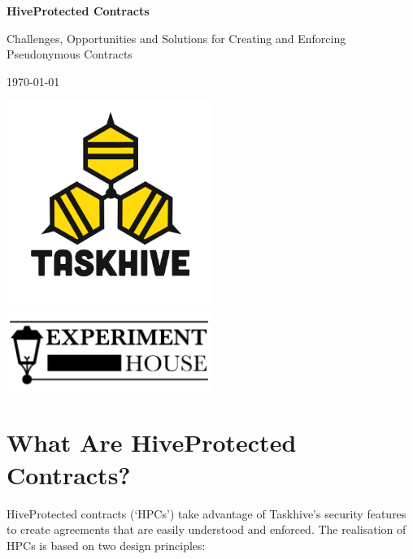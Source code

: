 \documentclass[a4paper,12pt]{article}
\begin{document}
\vspace*{\fill}

\begin{titlebox}
\begin{center}
\Huge{\textbf{HiveProtected Contracts}}

\vspace{1em}

\large{Challenges, Opportunities and Solutions for Creating and Enforcing Pseudonymous Contracts}

\vspace{1em}

\large{\today}
\end{center}
\end{titlebox}

\vfill

\begin{center}
\includegraphics[width=0.5\textwidth]{TH.png}\\
\includegraphics[width=0.5\textwidth]{EH.png}
\end{center}

\newpage

\setcounter{tocdepth}{2}

\tableofcontents

\section{What Are HiveProtected Contracts?}

HiveProtected contracts (`HPCs') take advantage of Taskhive's security features to create agreements that are easily understood and enforced. The realisation of HPCs is based on two design principles:
\end{document}
